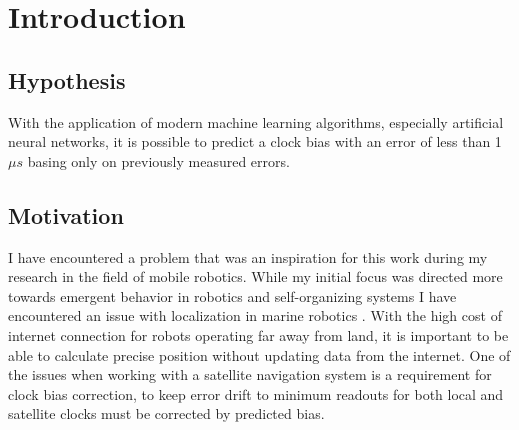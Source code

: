 \chapter{Introduction}

\FloatBarrier
\section{Hypothesis}
With the application of modern machine learning algorithms, especially artificial neural networks,
it is possible to predict a clock bias with an error of less than 1 $\mu s$ basing only on
previously measured errors. 



\FloatBarrier
\section{Motivation}
I have encountered a problem that was an inspiration for this work during my research in the 
field of mobile robotics.
While my initial focus was directed more towards emergent behavior in robotics and self-organizing 
systems \cite{Gnys2017}\cite{Gnys2019} I have encountered an issue with localization in marine 
robotics \cite{Cabrera-Gamez2014}.
With the high cost of internet connection for robots operating far away from land, 
it is important to be able to calculate precise position without updating data from the internet.
One of the issues when working with a satellite navigation system is a requirement for clock bias
correction, to keep error drift to minimum readouts for both local and satellite clocks must
be corrected by predicted bias.
